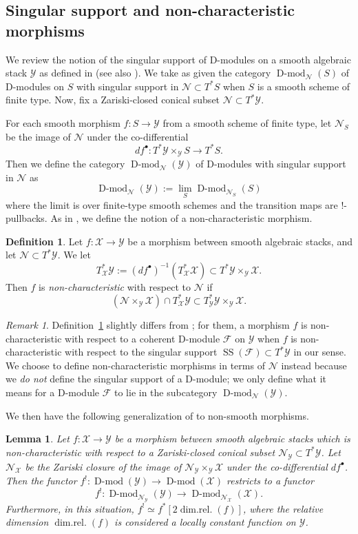 \documentclass[11pt]{amsart}
\newcommand{\cF}{\mathcal{F}}
\newcommand{\cY}{{\mathcal Y}}
\newcommand{\cN}{{\mathcal N}}
\DeclareMathOperator{\Dmod}{D-mod}
\newtheorem{lemma}[thm]{Lemma}
\theoremstyle{remark}
\newtheorem*{remark}{Remark}
\theoremstyle{definition}
\newtheorem{defn}[thm]{Definition}
\begin{document}
\subsection{Singular support and non-characteristic morphisms}
We review the notion of the singular support of D-modules on a smooth algebraic stack $\cY$ as defined in \cite[Appendix~\S{}F.6.3]{AGKRRV} (see also \cite[\S2.2.3]{quasi-temp}). We take as given the category $\Dmod_\cN(S)$ of D-modules on $S$ with singular support in $\cN\subset T^*S$ when $S$ is a smooth scheme of finite type. Now, fix a Zariski-closed conical subset $\cN\subset T^*\cY$.

For each smooth morphism $f\colon S\to\cY$ from a smooth scheme of finite type, let $\cN_S$ be the image of $\cN$ under the co-differential \[df^\bullet\colon T^*\cY\times_\cY S\to T^*S.\] Then we define the category $\Dmod_\cN(\cY)$ of D-modules with singular support in $\cN$ as
\[
\Dmod_\cN(\cY):=\lim_S\Dmod_{\cN_S}(S)
\]
where the limit is over finite-type smooth schemes and the transition maps are $!$-pullbacks. 
As in \cite[Definition~2.4.2]{HTT}, we define the notion of a non-characteristic morphism.
\begin{defn}\label{defn:non-char}
    Let $f\colon\mathcal X\to\mathcal Y$ be a morphism between smooth algebraic stacks, and let $\cN\subset T^*\cY$. We let
    \[
    T^*_{\mathcal X}\cY:=(df^\bullet)^{-1}(T_{\mathcal X}^*\mathcal X)\subset T^*\mathcal Y\times_{\mathcal Y}\mathcal X.
    \]
    Then $f$ is \emph{non-characteristic} with respect to $\cN$ if 
    \[
    (\cN\times_\cY\mathcal X)\cap T^*_{\mathcal X}\cY\subset T^*_\cY\cY\times_\cY\mathcal X.
    \]
\end{defn}
\begin{remark}
    Definition~\ref{defn:non-char} slightly differs from \cite[Definition~2.4.2]{HTT}; for them, a morphism $f$ is non-characteristic with respect to a coherent D-module $\cF$ on $\cY$ when $f$ is non-characteristic with respect to the singular support $\operatorname{SS}(\cF)\subset T^*\cY$ in our sense. We choose to define non-characteristic morphisms in terms of $\cN$ instead because we \emph{do not} define the singular support of a D-module; we only define what it means for a D-module $\cF$ to lie in the subcategory $\Dmod_\cN(\cY)$.
\end{remark}
We then have the following generalization of \cite[Lemma~2.2.5.1]{quasi-temp} to non-smooth morphisms.
\begin{lemma}\label{lem:SS-functorial}
    Let $f\colon\mathcal X\to\mathcal Y$ be a morphism between smooth algebraic stacks which is non-characteristic with respect to a Zariski-closed conical subset $\cN_\cY\subset T^*\cY$. Let $\cN_{\mathcal X}$ be the Zariski closure of the image of $\cN_\cY\times_\cY\mathcal X$ under the co-differential $df^\bullet$. Then the functor $f^!\colon\Dmod(\cY)\to\Dmod(\mathcal X)$ restricts to a functor
    \[
    f^!\colon\Dmod_{\cN_\cY}(\cY)\to\Dmod_{\cN_{\mathcal X}}(\mathcal X).
    \]
    Furthermore, in this situation, $f^!\simeq f^*[2\operatorname{dim.rel.}(f)]$, where the relative dimension $\operatorname{dim.rel.}(f)$ is considered a locally constant function on $\cY$.
\end{lemma}
\end{document}
